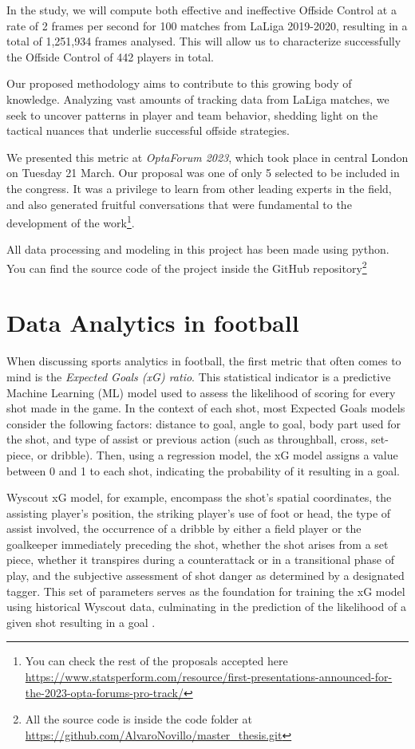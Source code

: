 \documentclass[
  10pt,
  twoside,nohyper]{book}
\begin{document}
In the study, we will compute both effective and ineffective Offside Control at a rate of 2 frames per second for 100 matches from LaLiga 2019-2020, resulting in a total of 1,251,934 frames analysed. This will allow us to characterize successfully the Offside Control of 442 players in total.

Our proposed methodology aims to contribute to this growing body of knowledge. Analyzing vast amounts of tracking data from LaLiga matches, we seek to uncover patterns in player and team behavior, shedding light on the tactical nuances that underlie successful offside strategies.

We presented this metric at \emph{OptaForum 2023}, which took place in central London on Tuesday 21 March. Our proposal was one of only 5 selected to be included in the congress. It was a privilege to learn from other leading experts in the field, and also generated fruitful conversations that were fundamental to the development of the work\footnote{You can check the rest of the proposals accepted here \url{https://www.statsperform.com/resource/first-presentations-announced-for-the-2023-opta-forums-pro-track/}}.

All data processing and modeling in this project has been made using python. You can find the source code of the project inside the GitHub repository\footnote{All the source code is inside the code folder at \url{https://github.com/AlvaroNovillo/master_thesis.git}}

\chapter{Data Analytics in football}\label{data-analytics-in-football}

When discussing sports analytics in football, the first metric that
often comes to mind is the \emph{Expected Goals (xG) ratio}. This statistical indicator is a predictive Machine Learning (ML) model used to assess the likelihood of scoring for every shot made in the game. In the context of each shot, most Expected Goals models consider the following factors: distance to goal, angle to goal, body part used for the shot, and type of assist or previous action (such as throughball, cross, set-piece, or dribble). Then, using a regression model, the xG model assigns a value between 0 and 1 to each shot, indicating the probability of it resulting in a goal.

Wyscout xG model, for example, encompass the shot's spatial coordinates, the assisting player's position, the striking player's use of foot or head, the type of assist involved, the occurrence of a dribble by either a field player or the goalkeeper immediately preceding the shot, whether the shot arises from a set piece, whether it transpires during a counterattack or in a transitional phase of play, and the subjective assessment of shot danger as determined by a designated tagger. This set of parameters serves as the foundation for training the xG model using historical Wyscout data, culminating in the prediction of the likelihood of a given shot resulting in a goal \autocite{wyscout}.
\end{document}
